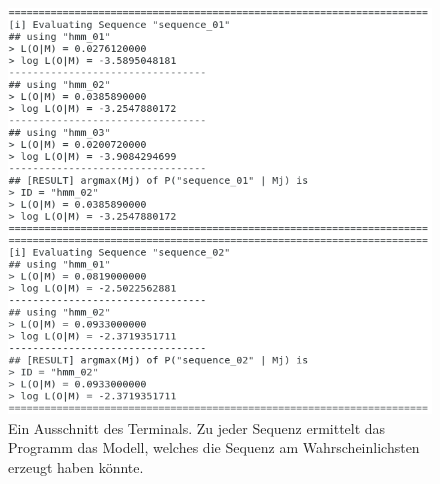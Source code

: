 \pagebreak
\begin{figure}
	\includegraphics[scale=0.7]{../screenshots/result.png}	
	\centering
	\captionsetup{}
	\caption{Ein Ausschnitt des Terminals. Zu jeder Sequenz ermittelt das Programm
	das Modell, welches die Sequenz am Wahrscheinlichsten erzeugt haben könnte.}
\end{figure}

\pagebreak
{}


\pagebreak


\pagebreak


\pagebreak


\pagebreak


\pagebreak


